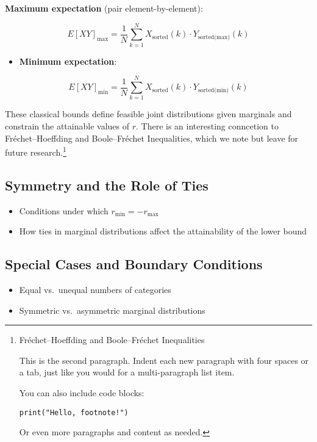 \documentclass[
  12pt,
]{article}
\providecommand{\tightlist}{%
  \setlength{\itemsep}{0pt}\setlength{\parskip}{0pt}}\usepackage{longtable,booktabs,array}
\theoremstyle{plain}
\theoremstyle{definition}
\theoremstyle{remark}
\begin{document}
\textbf{Maximum expectation} (pair element-by-element):

\[E[XY]_{\text{max}} = \frac{1}{N}\sum_{k=1}^{N} X_{\text{sorted}}(k)\cdot Y_{\text{sorted(max)}}(k)\]

\begin{itemize}
\tightlist
\item
  \textbf{Minimum expectation}:
\end{itemize}

\[E[XY]_{\text{min}} = \frac{1}{N}\sum_{k=1}^{N} X_{\text{sorted}}(k)\cdot Y_{\text{sorted(min)}}(k)\]

These classical bounds define feasible joint distributions given
marginals and constrain the attainable values of \(r\). There is an
interesting conncetion to Fréchet--Hoeffding and Boole--Fréchet
Inequalities, which we note but leave for future research.\footnote{Fréchet--Hoeffding
  and Boole--Fréchet Inequalities

  This is the second paragraph. Indent each new paragraph with four
  spaces or a tab, just like you would for a multi-paragraph list item.

  You can also include code blocks:

\begin{Verbatim}
print("Hello, footnote!")
\end{Verbatim}

  Or even more paragraphs and content as needed.}

\subsection{Symmetry and the Role of
Ties}\label{symmetry-and-the-role-of-ties}

\begin{itemize}
\tightlist
\item
  Conditions under which \(r_{\min} = -r_{\max}\)
\item
  How ties in marginal distributions affect the attainability of the
  lower bound
\end{itemize}

\subsection{Special Cases and Boundary
Conditions}\label{special-cases-and-boundary-conditions}

\begin{itemize}
\tightlist
\item
  Equal vs.~unequal numbers of categories\\
\item
  Symmetric vs.~asymmetric marginal distributions
\end{itemize}
\end{document}
